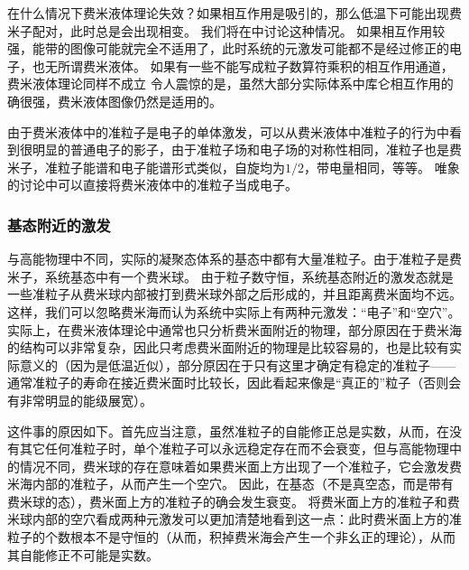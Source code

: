 \documentclass[hyperref, UTF8, a4paper]{ctexart}
\renewcommand{\autoref}{\prettyref}
\begin{document}
在什么情况下费米液体理论失效？如果相互作用是吸引的，那么低温下可能出现费米子配对，此时总是会出现相变。
我们将在\autoref{sec:low-and-super}中讨论这种情况。
如果相互作用较强，能带的图像可能就完全不适用了，此时系统的元激发可能都不是经过修正的电子，也无所谓费米液体。
如果有一些不能写成粒子数算符乘积的相互作用通道，费米液体理论同样不成立
令人震惊的是，虽然大部分实际体系中库仑相互作用的确很强，费米液体图像仍然是适用的。

由于费米液体中的准粒子是电子的单体激发，可以从费米液体中准粒子的行为中看到很明显的普通电子的影子，由于准粒子场和电子场的对称性相同，准粒子也是费米子，准粒子能谱和电子能谱形式类似，自旋均为$1/2$，带电量相同，等等。
唯象的讨论中可以直接将费米液体中的准粒子当成电子。

\subsubsection{基态附近的激发}\label{sec:fermi-liquid-ground}

与高能物理中不同，实际的凝聚态体系的基态中都有大量准粒子。由于准粒子是费米子，系统基态中有一个费米球。
由于粒子数守恒，系统基态附近的激发态就是一些准粒子从费米球内部被打到费米球外部之后形成的，并且距离费米面均不远。
这样，我们可以忽略费米海而认为系统中实际上有两种元激发：“电子”和“空穴”。
实际上，在费米液体理论中通常也只分析费米面附近的物理，部分原因在于费米海的结构可以非常复杂，因此只考虑费米面附近的物理是比较容易的，也是比较有实际意义的（因为是低温近似），部分原因在于只有这里才确定有稳定的准粒子——通常准粒子的寿命在接近费米面时比较长，因此看起来像是“真正的”粒子（否则会有非常明显的能级展宽）。

这件事的原因如下。首先应当注意，虽然准粒子的自能修正总是实数，从而，在没有其它任何准粒子时，单个准粒子可以永远稳定存在而不会衰变，但与高能物理中的情况不同，费米球的存在意味着如果费米面上方出现了一个准粒子，它会激发费米海内部的准粒子，从而产生一个空穴。
因此，在基态（不是真空态，而是带有费米球的态），费米面上方的准粒子的确会发生衰变。
将费米面上方的准粒子和费米球内部的空穴看成两种元激发可以更加清楚地看到这一点：此时费米面上方的准粒子的个数根本不是守恒的（从而，积掉费米海会产生一个非幺正的理论），从而其自能修正不可能是实数。
\end{document}
